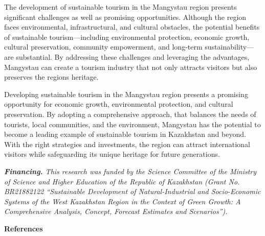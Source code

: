 \begin{multicols}{2}
The development of sustainable tourism in the Mangystau region presents
significant challenges as well as promising opportunities. Although the
region faces environmental, infrastructural, and cultural obstacles, the
potential benefits of sustainable tourism---including environmental
protection, economic growth, cultural preservation, community
empowerment, and long-term sustainability---are substantial. By
addressing these challenges and leveraging the advantages, Mangystau can
create a tourism industry that not only attracts visitors but also
preserves the region\textquotesingle s heritage.

Developing sustainable tourism in the Mangystau region presents a
promising opportunity for economic growth, environmental protection, and
cultural preservation. By adopting a comprehensive approach, that
balances the needs of tourists, local communities, and the environment,
Mangystau has the potential to become a leading example of sustainable
tourism in Kazakhstan and beyond. With the right strategies and
investments, the region can attract international visitors while
safeguarding its unique heritage for future generations.

\emph{{\bfseries Financing.} This research was funded by the Science
Committee of the Ministry of Science and Higher Education of the
Republic of Kazakhstan (Grant No. BR21882122 ``Sustainable Development
of Natural-Industrial and Socio-Economic Systems of the West Kazakhstan
Region in the Context of Green Growth: A Comprehensive Analysis,
Concept, Forecast Estimates and Scenarios'').}
\end{multicols}

\begin{center}
{\bfseries References}
\end{center}

